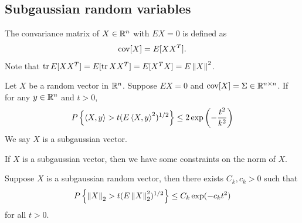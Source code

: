 \documentclass[a4paper]{article}
\begin{document}
\subsection{Subgaussian random variables}

The convariance matrix of $X \in \mathbb{R}^n$ with $E X = 0$ is defined as
\[
  \operatorname{cov} [X] = E [X X^T].
\]
Note that $\operatorname{tr} E[X X^T] = 
E [\operatorname{tr} X X^T] = E [X^T X] = E \left\lVert X\right\rVert^2$.

\begin{defi}
  Let $X$ be a random vector in $\mathbb{R}^n$. Suppose $EX = 0$
  and $\operatorname{cov} [X] = \Sigma \in \mathbb{R}^{n \times n}$. If 
  for any $y \in \mathbb{R}^n$ and $t > 0$, 
  \[
  P \left\{ \left\langle X, y \right\rangle > t ( E \left\langle X, y \right\rangle^2 )^{1/2} 
  \right\} \leq 2 \exp \left( - \frac{t^2}{k^2} \right)
  \]
  We say $X$ is a subgaussian vector.
\end{defi}

If $X$ is a subgaussian vector, then we have some constraints on 
the norm of $X$.

\begin{thm}
  Suppose $X$ is a subgaussian random vector, then there exists 
  $C_k, c_k > 0$ such that 
  \[
  P \left\{ \left\lVert X\right\rVert_2 > t ( E \left\lVert X\right\rVert_2^2 )^{1/2} \right\}
  \leq C_k \exp (- c_k t^2)
  \]
  for all $t > 0$.
\end{thm}
\end{document}
